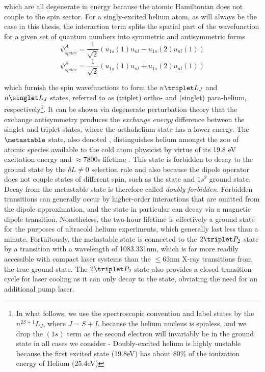 	\noindent which are all degenerate in energy because the atomic Hamiltonian does not couple to the spin sector. For a singly-excited helium atom, as will always be the case in this thesis, the interaction term splits the spatial part of the wavefunction for a given set of quantum numbers into symmetric and antisymmetric forms
	$$
	\psi^{A}_{space} = \frac{1}{\sqrt{2}}\left(u_{1s}(1)u_{nl} - u_{1s}(2)u_{nl}(1)\right)
	$$
	$$
	\psi^{S}_{space} = \frac{1}{\sqrt{2}}\left(u_{1s}(1)u_{nl} + u_{1s}(2)u_{nl}(1)\right)
	$$


	which furnish the spin wavefunctions to form the $n\triplet L_{J}$ and $n\singlet L_{J}$ states, referred to as (triplet) ortho- and (singlet) para-helium, respectively\footnote{In what follows, we use the spectroscopic convention and label states by the $n^{2S+1}L_J$, where $J=S+L$ because the helium nucleus is spinless, and we drop the $(1s)$ term as the second electron will invariably be in the ground state in all cases we consider -  Doubly-excited helium is highly unstable because the first excited state (19.8eV) has about 80\% of the ionization energy of Helium (25.4eV) }. It can be shown via degenerate perturbation theory that the exchange antisymmetry produces the \emph{exchange energy} difference between the singlet and triplet states, where the  orthohelium state has a lower energy.  The $\metastable$ state, also denoted \mhe, distinguishes helium amongst the zoo of atomic species available to the cold atom physicist by virtue of its 19.8 eV excitation energy and $\approx 7800$s lifetime \cite{hodgman09}.  This state is forbidden to decay to the ground state by the $\delta L\neq0$ selection rule and also because the dipole operator does not couple states of different spin, such as the \mhe state and $1s^2$  ground state. Decay from the metastable state is  therefore called \emph{doubly forbidden}. Forbidden transitions can generally occur by higher-order interactions that are omitted from the dipole approximation, and the \mhe state in particular can decay via a magnetic dipole transition. Nonetheless, the two-hour lifetime is effectively a ground state for the purposes of ultracold helium experiments, which generally last less than a minute. Fortuitously, the metastable state is connected to the $2\triplet P_2$ state by a transition with a wavelength of 1083.331nm, which is far more readily accessible with compact laser systems than the $\leq 63$nm X-ray transitions from the true ground state. The $2\triplet P_2$ state also provides a closed transition cycle for laser cooling as it can only decay to the \mhe state, obviating the need for an additional pump laser. 

